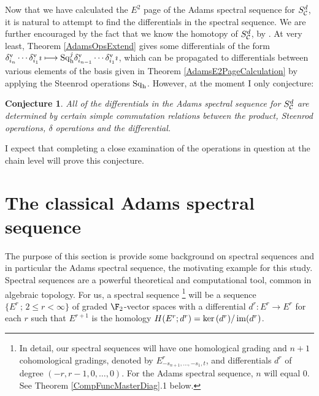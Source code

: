 \documentclass[11pt]{article}
\theoremstyle{plain}
\newtheorem{conjectureAlpha}{Conjecture}
\newcommand{\Sq}{\mathrm{Sq}}
\begin{document}
%











Now that we have calculated the $E^2$ page of the Adams spectral sequence for $S^d_{\mathcal{C}}$, it is natural to attempt to find the differentials in the spectral sequence. We are further encouraged by the fact that we know the homotopy of $S^d_{\mathcal{C}}$, by \cite{DwyerHtpyOpsSimpComAlg.pdf}. At very least, Theorem \ref{AdamsOpsExtend} gives some differentials of the form $\delta_{i_n}^\textup{v}\cdots \delta_{i_1}^\textup{v}\imath\mapsto \Sq_\textup{h}^{j}\delta_{i_{n-1}}^\textup{v}\cdots \delta_{i_1}^\textup{v}\imath$, which can be propagated to differentials between various elements of the basis given in Theorem \ref{AdamsE2PageCalculation} by applying the Steenrod operations $\Sq_\textup{h}$. However, at the moment I only conjecture:
\begin{conjectureAlpha}
All of the differentials in the Adams spectral sequence for $S^d_{\mathcal{C}}$ are determined by certain simple commutation relations between the product, Steenrod operations, $\delta$ operations and the differential.
\end{conjectureAlpha}
\noindent I expect that completing a close examination of the operations in question at the chain level will prove this conjecture.
\section{The classical Adams spectral sequence}\label{backgroundSection}
The purpose of this section is provide some background on spectral sequences and in particular the Adams spectral sequence, the motivating example for this study.
Spectral sequences are a powerful theoretical and computational tool, common in algebraic topology. %
For us, a spectral sequence%
\footnote{In detail, our spectral sequences will have one homological grading and $n+1$ cohomological gradings, denoted by $E^r_{-s_{n+1},\ldots,-s_1,t}$, and differentials $d^r$ of degree $(-r,r-1,0,\ldots,0)$. For the Adams spectral sequence, $n$ will equal $0$. See Theorem \ref{CompFuncMasterDiag}.1 below.} will be a sequence $\{E^r\,;\,2\leq r<\infty\}$ of graded $\F_2$-vector spaces with a differential $d^r:E^r\to E^r$ for each $r$ such that $E^{r+1}$ is the homology $H(E^r;d^r)=\textup{ker}\,(d^r)/\operatorname{im}(d^r)$.
\end{document}
